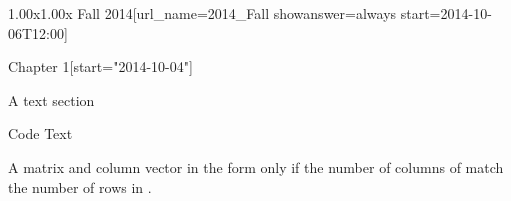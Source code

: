 \documentclass[12pt]{article}
\begin{document}
\begin{edXcourse}{1.00x}{1.00x Fall 2014}[url_name=2014_Fall showanswer=always start=2014-10-06T12:00]

\begin{edXchapter}{Chapter 1}[start="2014-10-04"]

\begin{edXsequential}{A text section}

\begin{edXtext}{Code Text}

A matrix  and column vector  in the form  only if the number of columns of  match the number of rows in .

\end{edXtext}

\end{edXsequential}

\end{edXchapter}

\end{edXcourse}
\end{document}
